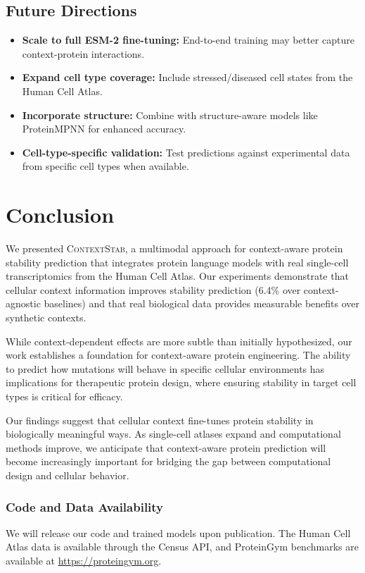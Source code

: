 \documentclass{article}
\newcommand{\contextstab}{\textsc{ContextStab}}
\begin{document}
\subsection{Future Directions}

\begin{itemize}
    \item \textbf{Scale to full ESM-2 fine-tuning:} End-to-end training may better capture context-protein interactions.
    \item \textbf{Expand cell type coverage:} Include stressed/diseased cell states from the Human Cell Atlas.
    \item \textbf{Incorporate structure:} Combine with structure-aware models like ProteinMPNN for enhanced accuracy.
    \item \textbf{Cell-type-specific validation:} Test predictions against experimental data from specific cell types when available.
\end{itemize}

\section{Conclusion}
\label{sec:conclusion}

We presented \contextstab, a multimodal approach for context-aware protein stability prediction that integrates protein language models with real single-cell transcriptomics from the Human Cell Atlas. Our experiments demonstrate that cellular context information improves stability prediction (6.4\% over context-agnostic baselines) and that real biological data provides measurable benefits over synthetic contexts.

While context-dependent effects are more subtle than initially hypothesized, our work establishes a foundation for context-aware protein engineering. The ability to predict how mutations will behave in specific cellular environments has implications for therapeutic protein design, where ensuring stability in target cell types is critical for efficacy.

Our findings suggest that cellular context fine-tunes protein stability in biologically meaningful ways. As single-cell atlases expand and computational methods improve, we anticipate that context-aware protein prediction will become increasingly important for bridging the gap between computational design and cellular behavior.

\subsubsection*{Code and Data Availability}

We will release our code and trained models upon publication. The Human Cell Atlas data is available through the Census API, and ProteinGym benchmarks are available at \url{https://proteingym.org}.



\end{document}
